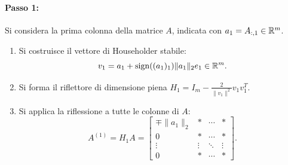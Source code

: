 \paragraph{Passo 1:}
Si considera la prima colonna della matrice $A$, indicata con $a_1 = A_{:, 1} \in \mathbb{R}^m$.
\begin{enumerate}
    \item Si costruisce il vettore di Householder stabile:
    \begin{equation}
        v_1 = a_1 + \operatorname{sign}((a_1)_1) \|a_1\|_2 e_1 \in \mathbb{R}^m.
    \end{equation}
    \item Si forma il riflettore di dimensione piena $H_1 = I_m - \frac{2}{\|v_1\|^2} v_1 v_1^T$.
    \item Si applica la riflessione a tutte le colonne di $A$:
    \begin{equation}
        A^{(1)} = H_1 A = \begin{bmatrix}
        \mp \|a_1\|_2 & * & \cdots & * \\
        0 & * & \cdots & * \\
        \vdots & \vdots & \ddots & \vdots \\
        0 & * & \cdots & *
        \end{bmatrix}.
    \end{equation}
\end{enumerate}

